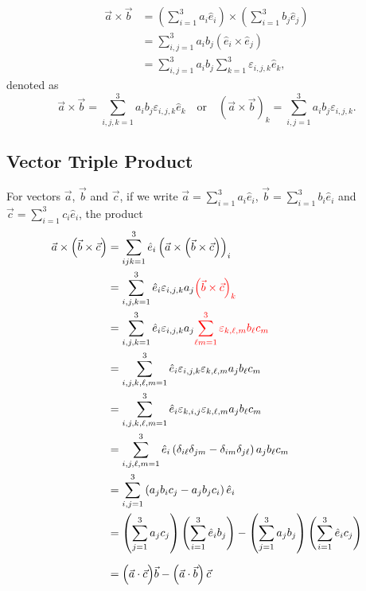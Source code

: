 \documentclass[12pt]{article}
\begin{document}
\begin{equation}
\begin{aligned}
\vec{a}\times\vec{b}
&=\left(\sum_{i=1}^{3}a_i\hat{e}_i\right)\times\left(\sum_{i=1}^{3}b_j\hat{e}_j\right)\\
&=\sum_{i,j=1}^{3}a_ib_j\left(\hat{e}_i\times\hat{e}_j\right)\\
&=\sum_{i,j=1}^{3}a_ib_j\sum_{k=1}^3\varepsilon_{i,j,k}\hat{e}_k,
\end{aligned}
\end{equation}
denoted as 
\begin{equation}
\vec{a}\times\vec{b}=\sum_{i,j,k=1}^{3}a_ib_j\varepsilon_{i,j,k}\hat{e}_k
\quad\text{or}\quad
\left(\vec{a}\times\vec{b}\right)_k=\sum_{i,j=1}^{3}a_ib_j\varepsilon_{i,j,k}.
\end{equation}


\subsection{Vector Triple Product}
For vectors $\vec{a}$, $\vec{b}$ and $\vec{c}$, if we write $\displaystyle \vec{a} = \sum_{i=1}^{3}a_{i}\hat{e}_i$, $\displaystyle \vec{b} = \sum_{i=1}^{3}b_{i}\hat{e}_i$ and $\displaystyle \vec{c} = \sum_{i=1}^{3}c_{i}\hat{e}_i$, the product
\begin{align}
\vec{a}\times\left(\vec{b}\times\vec{c}\right)
&=\sum_{ijk=1}^3\hat{e}_i\left(\vec{a}\times\left(\vec{b}\times\vec{c}\right)\right)_i
\\
&=\sum_{i,j,k=1}^3\hat{e}_i\varepsilon_{i,j,k} a_j  {\color{red}\left(\vec{b}\times\vec{c}\right)_k}
\\
&=\sum_{i,j,k=1}^3\hat{e}_i\varepsilon_{i,j,k} a_j  {\color{red}\sum_{\ell m=1}^3\varepsilon_{k,\ell,m}b_{\ell}c_m}
\\
&=\sum_{i,j,k,\ell,m=1}^3\hat{e}_i\varepsilon_{i,j,k} \varepsilon_{k,\ell,m}a_j  b_{\ell}c_m
\\
&=\sum_{i,j,k,\ell,m=1}^3\hat{e}_i\varepsilon_{k,i,j} \varepsilon_{k,\ell,m}a_j  b_{\ell}c_m
\\
&=\sum_{i,j,\ell,m=1}^3\hat{e}_i\left(\delta_{i\ell}\delta_{jm}-\delta_{im}\delta_{j\ell}\right)a_j  b_{\ell}c_m
\\
&=\sum_{i,j=1}^3\left( a_j  b_i c_j - a_j  b_j c_i\right)\hat{e}_i
\\
&=\left(\sum_{j=1}^3a_jc_j\right)\left(\sum_{i=1}^3\hat{e}_ib_j\right)-
		\left(\sum_{j=1}^3a_jb_j\right)\left(\sum_{i=1}^3\hat{e}_ic_j\right)
\\[6pt]
&=\Big(\vec{a}\cdot\vec{c}\Big)\vec{b}-\left(\vec{a}\cdot\vec{b}\right)\vec{c}
\end{align}
\end{document}
